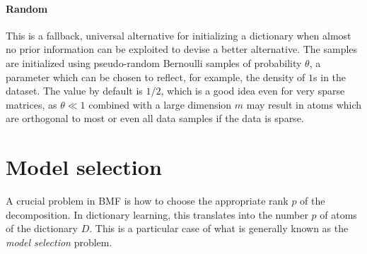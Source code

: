 \documentclass[twocolumn]{IEEEtran}
\theoremstyle{definition}
\begin{document}
\paragraph{Random} This is a fallback, universal alternative for initializing a dictionary when almost no prior information can be exploited to devise a better alternative. The samples are initialized using pseudo-random Bernoulli samples of probability $\theta$, a parameter which can be chosen to reflect, for example, the density of $1$s in the dataset.  The value by default is $1/2$, which is a good idea even for very sparse matrices, as $\theta \ll 1$ combined with a large dimension $m$ may result in atoms which are orthogonal to most or even all data samples if the data is sparse.


%
% 
%

\section{Model selection}
\label{sec:model-selection}

A crucial problem in BMF is how to choose the appropriate rank $p$ of the decomposition. In dictionary learning, this translates into the number $p$ of atoms of the dictionary $D$. This is a particular case of what is generally known as the \emph{model selection} problem. 
\end{document}
